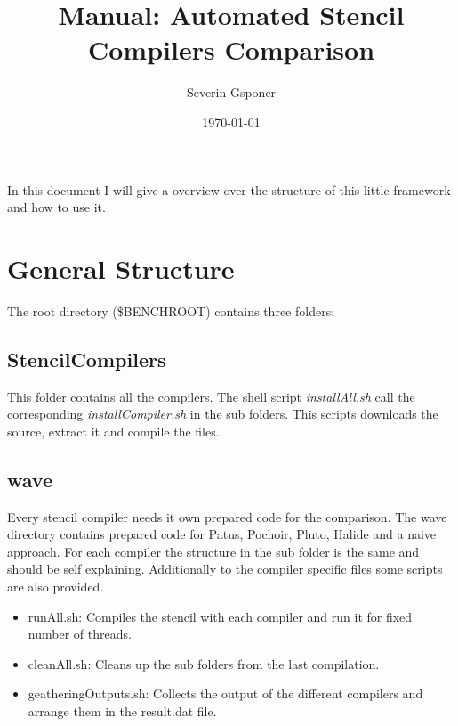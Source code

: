 \documentclass[AEJ]{AEA}
\begin{document}
\title{Manual: Automated Stencil Compilers Comparison}
\author{Severin Gsponer}
\date{\today}


\begin{abstract}

\end{abstract}

\maketitle

In this document I will give a overview over the structure of this little framework and how to use it. 

\section{General Structure}
The root directory (\$BENCHROOT) contains three folders:


\subsection{StencilCompilers}
This folder contains all the compilers. The shell script \emph{installAll.sh} call the corresponding \emph{installCompiler.sh} in the sub folders. This scripts downloads the source, extract it and compile the files.  

\subsection{wave}
Every stencil compiler needs it own prepared code for the comparison. The wave directory contains prepared code for Patus, Pochoir, Pluto, Halide and a naive approach. For each compiler the structure in the sub folder is the same and should be self explaining. Additionally to the compiler specific files some scripts are also provided.\\
\begin{itemize}
	\item runAll.sh: Compiles the stencil with each compiler and run it for fixed number of threads. 
	\item cleanAll.sh: Cleans up the sub folders from the last compilation. 
	\item geatheringOutputs.sh: Collects the output of the different compilers and arrange them in the result.dat file.
\end{itemize}
\end{document}
